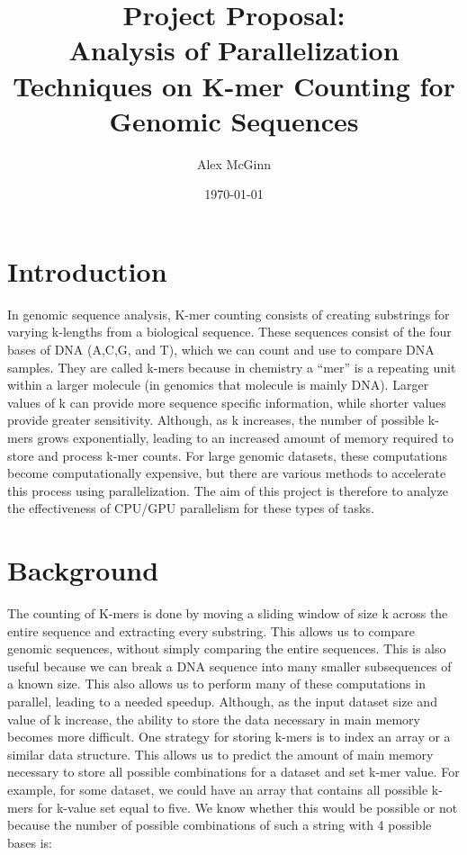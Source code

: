 \documentclass{article}
\title{Project Proposal:\\
        Analysis of Parallelization Techniques on K-mer Counting for Genomic Sequences}
\author{Alex McGinn}
\date{\today}
\begin{document}
\maketitle

\section{Introduction}

In genomic sequence analysis, K-mer counting consists of creating substrings for varying k-lengths from a  
biological sequence. These sequences consist of the four bases of DNA (A,C,G, and T), which we can count  
and use to compare DNA samples. They are called k-mers because in chemistry a ``mer'' is a repeating unit  
within a larger molecule (in genomics that molecule is mainly DNA). Larger values of k can provide more  
sequence specific information, while shorter values provide greater sensitivity\cite{lees2016seer}. Although, as k increases, the number of possible k-mers grows exponentially, leading  
to an increased amount of memory required to store and process k-mer counts.  
For large genomic datasets, these computations become computationally expensive, but there are various methods to accelerate this  
process using parallelization. The aim of this project is therefore to analyze the effectiveness of CPU/GPU parallelism for these  
types of tasks.

\section{Background}

The counting of K-mers is done by moving a sliding window of size k across the entire sequence and extracting every substring.  
This allows us to compare genomic sequences, without simply comparing the entire sequences. This is also useful because we can  
break a DNA sequence into many smaller subsequences of a known size.  
This also allows us to perform many of these computations in parallel, leading to a needed speedup. Although, as the input  
dataset size and value of k increase, the ability to store the data necessary in main memory becomes more  
difficult. One strategy for storing k-mers is to index an array or a similar data structure. This allows us to predict  
the amount of main memory necessary to store all possible combinations for a dataset and set k-mer value.  
For example, for some dataset, we could have an array that contains all possible k-mers for k-value set equal to five.  
We know whether this would be possible or not because the number of possible combinations of such a string with 4  
possible bases is:
 
\end{document}
